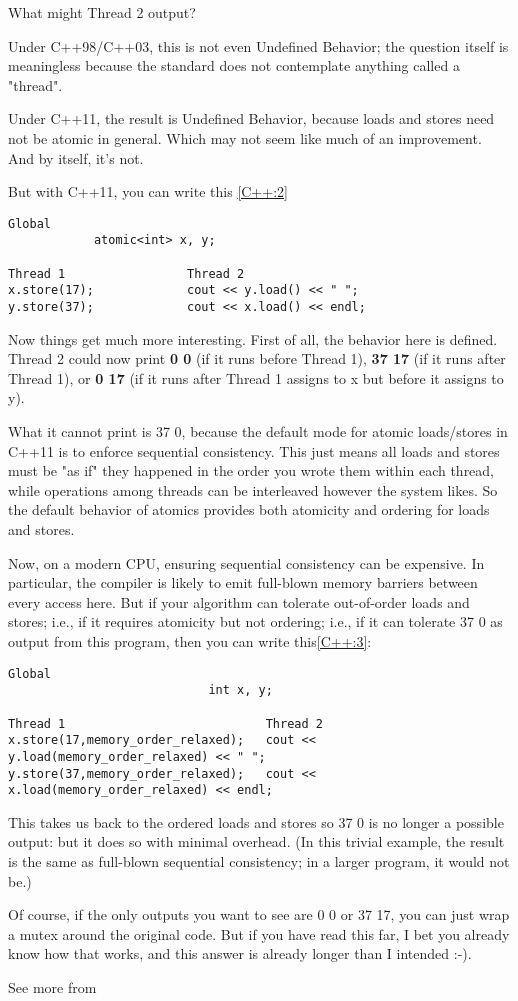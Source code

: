 What might Thread 2 output?

Under C++98/C++03, this is not even Undefined Behavior; the question itself is
 meaningless because the standard does not contemplate anything called a
  "thread".

Under C++11, the result is Undefined Behavior, because loads and stores 
need not be atomic in general. Which may not seem like much of an improvement. 
And by itself, it's not.

But with C++11, you can write this \ref{C++:2}


\begin{lstlisting}[label={C++:2},caption={Using atomic in C++}]
            Global
            atomic<int> x, y;

Thread 1                 Thread 2
x.store(17);             cout << y.load() << " ";
y.store(37);             cout << x.load() << endl;
\end{lstlisting}


Now things get much more interesting. First of all, the behavior here is defined.
 Thread 2 could now print \textbf{0 0} (if it runs before Thread 1), 
 \textbf{37 17} (if it runs after Thread 1), or \textbf{0 17} (if it runs after Thread 1 assigns 
 to x but before it assigns to y).

What it cannot print is 37 0, because the default mode for atomic 
loads/stores in C++11 is to enforce sequential consistency.
 This just means all loads and stores must be "as if" they happened
  in the order you wrote them within each thread, while operations 
  among threads can be interleaved however the system likes. 
  So the default behavior of atomics provides both atomicity and 
  ordering for loads and stores.

Now, on a modern CPU, ensuring sequential consistency can be expensive. 
In particular, the compiler is likely to emit full-blown memory barriers 
between every access here. But if your algorithm can tolerate out-of-order 
loads and stores; i.e., if it requires atomicity but not ordering; i.e., 
if it can tolerate 37 0 as output from this program, then you can write this\ref{C++:3}:


\begin{lstlisting}[label={C++:3},caption={Using memory\_order\_relaxed in C++}]
                            Global
                            int x, y;

Thread 1                            Thread 2
x.store(17,memory_order_relaxed);   cout << y.load(memory_order_relaxed) << " ";
y.store(37,memory_order_relaxed);   cout << x.load(memory_order_relaxed) << endl;
\end{lstlisting}


This takes us back to the ordered loads and stores
 so 37 0 is no longer a possible output: but it does so with minimal overhead. 
 (In this trivial example, the result is the same as full-blown sequential 
 consistency; in a larger program, it would not be.)

Of course, if the only outputs you want to see are 0 0 or 37 17, 
you can just wrap a mutex around the original code. But if you have read 
this far, I bet you already know how that works, and this answer is 
already longer than I intended :-).


See more from \cite{CppConcu2:online}
